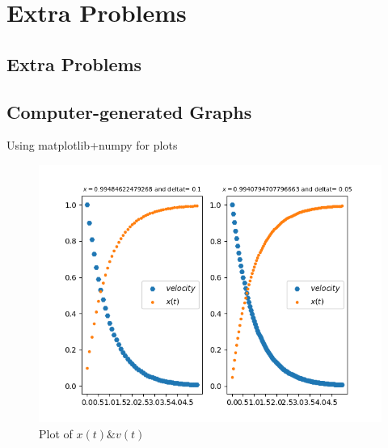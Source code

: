 \documentclass[]{article}
\begin{document}
\section{Extra Problems}
\subsection{Extra Problems}

\newpage
\subsection{Computer-generated Graphs}
Using matplotlib+numpy for plots\\
\begin{figure}[htbp]
    \centering
    \includegraphics[width=1.5\textwidth]{Figure_1.png}
    \caption{Plot of $x(t) \& v(t)$}
    \label{fig:myphoto}
    \end{figure}
\end{document}
